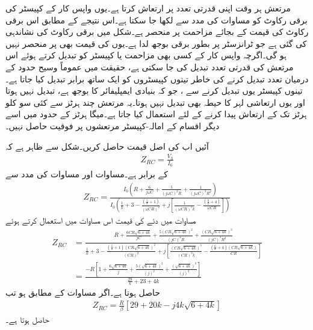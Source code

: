 مرتعش ہر وقت اپنی قدرتی تعدد پر ارتعاش کرتا ہے۔یوں واپس کار کے کپیسٹر کی برقی رکاوٹ  کو مساوات  کی مدد سے  لکھا جا سکتا ہے۔اس نتیجے کے مطابق اس برقی رکاوٹ کی قیمت  کے بجائے مزاحمت  پر منحصر ہے۔شکل  میں برقی رکاوٹ  کی نشاندہی کی گئی ہے جو ٹرانزسٹر پر بطور برقی بوجھ لدا ہے۔یوں  کی قیمت بھی  پر منحصر نہیں ہو گی۔اگرچہ واپس کار کے کسی بھی مزاحمت یا کپیسٹر کو تبدیل کرتے ہوئے اس مرتعش کی قدرتی تعدد تبدیل کی جا سکتی ہے، حقیقت میں عموماً وسیح حدود کے درمیان تعدد تبدیل کرنے کی خاطر تینوں کپیسٹروں کو ایک ساتھ برابر تبدیل کیا جاتا ہے۔تینوں کپیسٹر یوں تبدیل کرنے سے  ، جو کہ بنیادی ایمپلیفائر کا بوجھ ہے، تبدیل نہیں ہوتا اور یوں ارتعاشی لہر کا حیطہ بھی تبدیل نہیں ہوتا۔یہ مرتعش چند ہرٹز  سے کئی سو کلو ہرٹز   تک کے ارتعاش پیدا کرنے کے لئے استعمال کیا جاتا ہے۔میگا ہرٹز  کے حدود میں اسے دیگر اقسام کے امالہ-کپیسٹر  مرتعشوں پر فوقیت حاصل نہیں۔

آئیں اب  کی اصل قیمت حاصل کریں۔شکل سے ظاہر ہے کہ
\begin{align*}
Z_{RC}=\frac{V_3}{I_6}
\end{align*}
کے برابر ہے۔مساوات  اور مساوات  کی مدد سے
\begin{align*}
Z_{RC}=\frac{I_0 \left(R+\frac{6}{j \omega C}+\frac{5}{\left(j \omega C \right )^2 R} +\frac{1}{\left(j \omega C \right )^3 R^2}\right)}{I_0 \left( \frac{1}{k}+3 -\frac{\left(\frac{5}{k}+1 \right )}{\left(\omega C R \right)^2}+j \left [\frac{1}{\left (\omega C R \right)^3 k}  -\frac{\left(\frac{6}{k}+4 \right)}{\omega C R}\right] \right )}
\end{align*}
مساوات  میں دئے  کی قیمت اس مساوات میں استعمال کرتے ہوئے
\begin{align*}
Z_{RC}&=\frac{ R+\frac{6 CR\sqrt{6+4k}}{j C}+\frac{5 \left(CR\sqrt{6+4k} \right)^2}{\left(j C \right )^2 R} +\frac{\left(CR\sqrt{6+4k} \right)^3}{\left(j C \right )^3 R^2}}{  \frac{1}{k}+3 -\frac{\left(\frac{5}{k}+1 \right ) \left(CR\sqrt{6+4k} \right)^2}{\left( C R \right)^2}+j \left [\frac{\left(CR\sqrt{6+4k} \right)^3}{\left (C R \right)^3 k}  -\frac{\left(\frac{6}{k}+4 \right)\left(CR\sqrt{6+4k} \right)}{C R}\right] }\\
&=\frac{-R \left[ 1+\frac{6\sqrt{6+4k}}{j }+\frac{5 \left(\sqrt{6+4k} \right)^2}{\left(j \right )^2} +\frac{\left(\sqrt{6+4k} \right)^3}{\left(j \right )^3} \right]}{\frac{29}{k}+23 +4k}
\end{align*}
حاصل ہوتا ہے۔اگر   مساوات  کے مطابق ہو تب
\begin{align}
Z_{RC}=\frac{R}{\beta} \left[ 29+20k -j 4 k \sqrt{6+4k}\right]
\end{align}
حاصل ہوتا ہے۔

